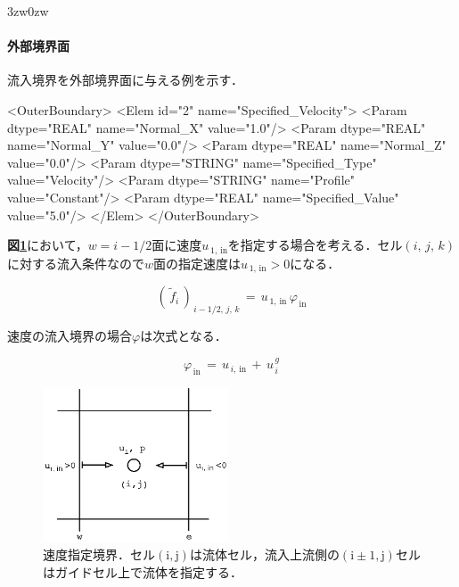 \begin{indentation}{3zw}{0zw}

\paragraph{外部境界面}
流入境界を外部境界面に与える例を示す．

{ \small
\begin{program}
<OuterBoundary>
  <Elem id="2" name="Specified_Velocity">
    <Param dtype="REAL"   name="Normal_X"        value="1.0"/>
    <Param dtype="REAL"   name="Normal_Y"        value="0.0"/>
    <Param dtype="REAL"   name="Normal_Z"        value="0.0"/>
    <Param dtype="STRING" name="Specified_Type"  value="Velocity"/>
    <Param dtype="STRING" name="Profile"         value="Constant"/>
    <Param dtype="REAL"   name="Specified_Value" value="5.0"/>
  </Elem>
</OuterBoundary>
\end{program}
}

\textbf{図\ref{fig:inflow BC}}において，$w=i-1/2$面に速度$u_{\,1,\,\mathrm{in}}$を指定する場合を考える．セル$(i,\,j,\,k)$に対する流入条件なので$w$面の指定速度は$u_{\,1,\,\mathrm{in}}>0$になる．

\begin{equation}
{\left(\, \tilde{f}_i \,\right)}_{\,i-1/2,\,j,\,k} \,=\, u_{\,1,\,\mathrm{in}} \,\varphi_{\,\mathrm{in}}
\label{eq:inflow flux}
\end{equation}

\noindent 速度の流入境界の場合$\varphi$は次式となる．

\begin{equation}
\varphi_{\,\mathrm{in}} \,=\, u_{\,i,\,\mathrm{in}} \,+\,u_{\,i}^{\,g}
\label{eq:inflow flux}
\end{equation}

\begin{figure}[htbp]
\begin{center}
\includegraphics[width=5.5cm,clip]{inflowBC.eps}
\end{center}
\caption{速度指定境界．セル$\mathrm{(i,j)}$は流体セル，流入上流側の$\mathrm{(i\pm1,j)}$セルはガイドセル上で流体を指定する．}
\label{fig:inflow BC}
\end{figure}


\end{indentation}

